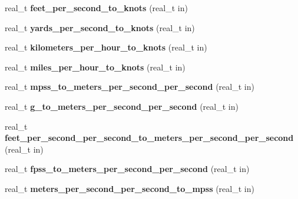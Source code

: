 \begin{DoxyCompactItemize}
\item 
\hypertarget{namespaceetk_abbb73c7b79ff942e3ea9f02e482d6e4c}{real\-\_\-t {\bfseries feet\-\_\-per\-\_\-second\-\_\-to\-\_\-knots} (real\-\_\-t in)}\label{namespaceetk_abbb73c7b79ff942e3ea9f02e482d6e4c}

\item 
\hypertarget{namespaceetk_a96de548fcb22f7d0fe3c8ce206cb0313}{real\-\_\-t {\bfseries yards\-\_\-per\-\_\-second\-\_\-to\-\_\-knots} (real\-\_\-t in)}\label{namespaceetk_a96de548fcb22f7d0fe3c8ce206cb0313}

\item 
\hypertarget{namespaceetk_a36a120c0d36f5f42311f54661a42e147}{real\-\_\-t {\bfseries kilometers\-\_\-per\-\_\-hour\-\_\-to\-\_\-knots} (real\-\_\-t in)}\label{namespaceetk_a36a120c0d36f5f42311f54661a42e147}

\item 
\hypertarget{namespaceetk_ad10fd2c2681b21dead694ebbd082f705}{real\-\_\-t {\bfseries miles\-\_\-per\-\_\-hour\-\_\-to\-\_\-knots} (real\-\_\-t in)}\label{namespaceetk_ad10fd2c2681b21dead694ebbd082f705}

\item 
\hypertarget{namespaceetk_a6b8b1d373be1b86ddd4745e7d8b94e7a}{real\-\_\-t {\bfseries mpss\-\_\-to\-\_\-meters\-\_\-per\-\_\-second\-\_\-per\-\_\-second} (real\-\_\-t in)}\label{namespaceetk_a6b8b1d373be1b86ddd4745e7d8b94e7a}

\item 
\hypertarget{namespaceetk_a7fc2d372cb36fb2a4c11b3d8cfe25372}{real\-\_\-t {\bfseries g\-\_\-to\-\_\-meters\-\_\-per\-\_\-second\-\_\-per\-\_\-second} (real\-\_\-t in)}\label{namespaceetk_a7fc2d372cb36fb2a4c11b3d8cfe25372}

\item 
\hypertarget{namespaceetk_ab3f8f59bd3bb142f71c2c576c64ef116}{real\-\_\-t {\bfseries feet\-\_\-per\-\_\-second\-\_\-per\-\_\-second\-\_\-to\-\_\-meters\-\_\-per\-\_\-second\-\_\-per\-\_\-second} (real\-\_\-t in)}\label{namespaceetk_ab3f8f59bd3bb142f71c2c576c64ef116}

\item 
\hypertarget{namespaceetk_a7f0ae6411057e5447b0b1d2b8b3b8a4e}{real\-\_\-t {\bfseries fpss\-\_\-to\-\_\-meters\-\_\-per\-\_\-second\-\_\-per\-\_\-second} (real\-\_\-t in)}\label{namespaceetk_a7f0ae6411057e5447b0b1d2b8b3b8a4e}

\item 
\hypertarget{namespaceetk_a833f668b6bea2be46a1b32bbb8aac7a1}{real\-\_\-t {\bfseries meters\-\_\-per\-\_\-second\-\_\-per\-\_\-second\-\_\-to\-\_\-mpss} (real\-\_\-t in)}\label{namespaceetk_a833f668b6bea2be46a1b32bbb8aac7a1}


\end{DoxyCompactItemize}
